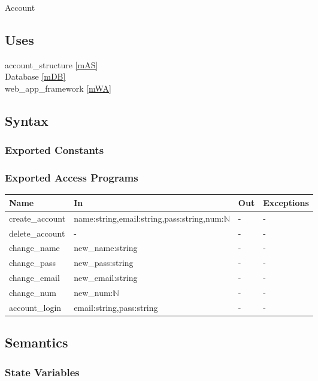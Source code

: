 \documentclass[12pt, titlepage]{article}
\begin{document}
Account

\subsection{Uses}

account\_structure \ref{mAS} \\
Database \ref{mDB} \\
web\_app\_framework \ref{mWA}

\subsection{Syntax}

\subsubsection{Exported Constants}

\subsubsection{Exported Access Programs}

\begin{center}
\begin{tabular}{p{3cm} p{9cm} p{2cm} p{2cm}}
\hline
\textbf{Name} & \textbf{In} & \textbf{Out} & \textbf{Exceptions} \\
\hline
create\_account & name:string,email:string,pass:string,num:$\mathbb{N}$ & - & - \\
delete\_account & - & - & - \\
change\_name & new\_name:string & - & - \\
change\_pass & new\_pass:string & - & - \\
change\_email & new\_email:string & - & - \\
change\_num & new\_num:$\mathbb{N}$ & - & - \\
account\_login & email:string,pass:string & - & - \\
\hline
\end{tabular}
\end{center}

\subsection{Semantics}

\subsubsection{State Variables}
\end{document}
